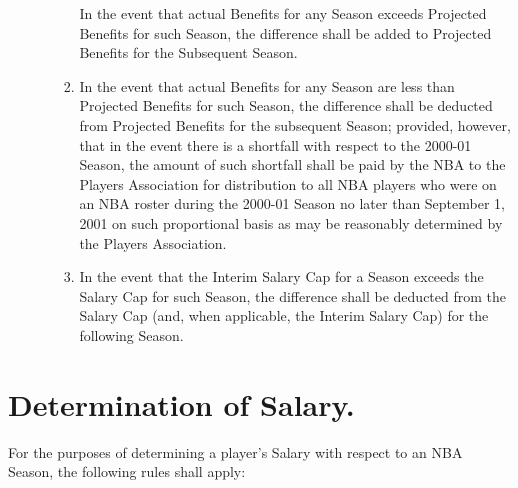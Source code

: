 \documentclass[
]{book}
\begin{document}
\begin{enumerate}
\begin{enumerate}
\begin{enumerate}
      In the event that actual Benefits for any Season exceeds Projected Benefits for such Season, the difference shall be added to Projected Benefits for the Subsequent Season.
    \item
      In the event that actual Benefits for any Season are less than Projected Benefits for such Season, the difference shall be deducted from Projected Benefits for the subsequent Season; provided, however, that in the event there is a shortfall with respect to the 2000-01 Season, the amount of such shortfall shall be paid by the NBA to the Players Association for distribution to all NBA players who were on an NBA roster during the 2000-01 Season no later than September 1, 2001 on such proportional basis as may be reasonably determined by the Players Association.
    \item
      In the event that the Interim Salary Cap for a Season exceeds the Salary Cap for such Season, the difference shall be deducted from the Salary Cap (and, when applicable, the Interim Salary Cap) for the following Season.
    \end{enumerate}
  \end{enumerate}
\end{enumerate}

\hypertarget{determination-of-salary.}{%
\section{Determination of Salary.}\label{determination-of-salary.}}

For the purposes of determining a player's Salary with respect to an NBA Season, the following rules shall apply:
\end{document}
